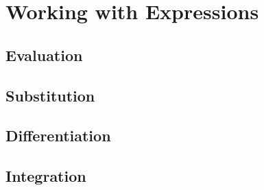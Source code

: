 
\chapter{Working with Expressions}

\section{Evaluation}

\section{Substitution}

\section{Differentiation}

\section{Integration}


